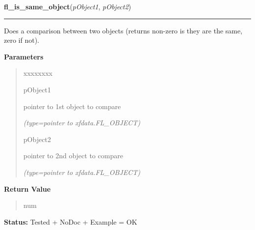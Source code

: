    \label{xformslib:library:fl_is_same_object}

    \vspace{0.5ex}

\hspace{.8\funcindent}\begin{boxedminipage}{\funcwidth}

    \raggedright \textbf{fl\_is\_same\_object}(\textit{pObject1}, \textit{pObject2})

    \vspace{-1.5ex}

    \rule{\textwidth}{0.5\fboxrule}
\setlength{\parskip}{2ex}
    Does a comparison between two objects (returns non-zero is they are the
    same, zero if not).

\setlength{\parskip}{1ex}
      \textbf{Parameters}
      \vspace{-1ex}

      \begin{quote}
        \begin{Ventry}{xxxxxxxx}

          \item[pObject1]

          pointer to 1st object to compare

            {\it (type=pointer to xfdata.FL\_OBJECT)}

          \item[pObject2]

          pointer to 2nd object to compare

            {\it (type=pointer to xfdata.FL\_OBJECT)}

        \end{Ventry}

      \end{quote}

      \textbf{Return Value}
    \vspace{-1ex}

      \begin{quote}
      num

      \end{quote}

\textbf{Status:} Tested + NoDoc + Example = OK



    \end{boxedminipage}

